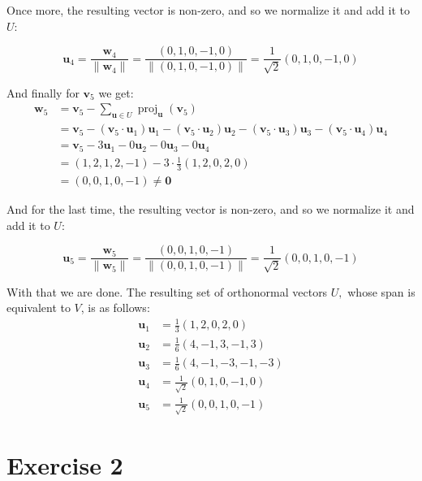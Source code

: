 \documentclass{article}
\begin{document}
Once more, the resulting vector is non-zero, and so we normalize it and add it to $U$:

$$\mathbf u_4=\frac{\mathbf w_4}{\|\mathbf w_4\|}=\frac{(0,1,0,-1,0)}{\|(0,1,0,-1,0)\|}=\boxed{\frac{1}{\sqrt 2}(0,1,0,-1,0)}$$

And finally for $\mathbf v_5$ we get:
\begin{align*}
  \mathbf w_5 &=\mathbf v_5-\sum_{\mathbf u\in U}\operatorname{proj}_\mathbf u(\mathbf v_5)\\
  &=\mathbf v_5-(\mathbf v_5\cdot\mathbf u_1)\mathbf u_1-(\mathbf v_5\cdot\mathbf u_2)\mathbf u_2-(\mathbf v_5\cdot\mathbf u_3)\mathbf u_3-(\mathbf v_5\cdot\mathbf u_4)\mathbf u_4\\
  &=\mathbf v_5-3\mathbf u_1-0\mathbf u_2-0\mathbf u_3-0\mathbf u_4\\
  &=(1, 2, 1, 2, -1)-3\cdot\frac{1}{3}(1, 2, 0, 2, 0)\\
  &=(0,0,1,0,-1)\not=\mathbf0
\end{align*}

And for the last time, the resulting vector is non-zero, and so we normalize it and add it to $U$:

$$\mathbf u_5=\frac{\mathbf w_5}{\|\mathbf w_5\|}=\frac{(0,0,1,0,-1)}{\|(0,0,1,0,-1)\|}=\boxed{\frac{1}{\sqrt 2}(0,0,1,0,-1)}$$

With that we are done. The resulting set of orthonormal vectors $U,$ whose span is equivalent to $V$, is as follows:
\begin{align*}
  \mathbf u_1&=\frac{1}{3}(1, 2, 0, 2, 0)\\
  \mathbf u_2&=\frac{1}{6}(4, -1, 3, -1, 3)\\
  \mathbf u_3&=\frac{1}{6}(4,-1,-3,-1,-3)\\
  \mathbf u_4&=\frac{1}{\sqrt 2}(0,1,0,-1,0)\\
  \mathbf u_5&=\frac{1}{\sqrt 2}(0,0,1,0,-1)
\end{align*}

\section*{Exercise 2}
\end{document}
